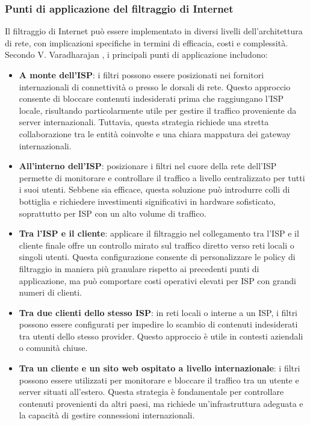 \subsubsection{Punti di applicazione del filtraggio di Internet}
Il filtraggio di Internet può essere implementato in diversi livelli dell'architettura di rete, con implicazioni specifiche in termini di efficacia, costi e complessità. Secondo V. Varadharajan \cite{DBLP:journals/ieeesp/Varadharajan10}, i principali punti di applicazione includono:

\begin{itemize}
  \item \textbf{A monte dell'ISP}: i filtri possono essere posizionati nei fornitori internazionali di connettività o presso le dorsali di rete. Questo approccio consente di bloccare contenuti indesiderati prima che raggiungano l'ISP locale, risultando particolarmente utile per gestire il traffico proveniente da server internazionali. Tuttavia, questa strategia richiede una stretta collaborazione tra le entità coinvolte e una chiara mappatura dei gateway internazionali.

  \item \textbf{All'interno dell'ISP}: posizionare i filtri nel cuore della rete dell'ISP permette di monitorare e controllare il traffico a livello centralizzato per tutti i suoi utenti. Sebbene sia efficace, questa soluzione può introdurre colli di bottiglia e richiedere investimenti significativi in hardware sofisticato, soprattutto per ISP con un alto volume di traffico.

  \item \textbf{Tra l'ISP e il cliente}: applicare il filtraggio nel collegamento tra l'ISP e il cliente finale offre un controllo mirato sul traffico diretto verso reti locali o singoli utenti. Questa configurazione consente di personalizzare le policy di filtraggio in maniera più granulare rispetto ai precedenti punti di applicazione, ma può comportare costi operativi elevati per ISP con grandi numeri di clienti.

  \item \textbf{Tra due clienti dello stesso ISP}: in reti locali o interne a un ISP, i filtri possono essere configurati per impedire lo scambio di contenuti indesiderati tra utenti dello stesso provider. Questo approccio è utile in contesti aziendali o comunità chiuse.

  \item \textbf{Tra un cliente e un sito web ospitato a livello internazionale}: i filtri possono essere utilizzati per monitorare e bloccare il traffico tra un utente e server situati all'estero. Questa strategia è fondamentale per controllare contenuti provenienti da altri paesi, ma richiede un'infrastruttura adeguata e la capacità di gestire connessioni internazionali.
\end{itemize}

